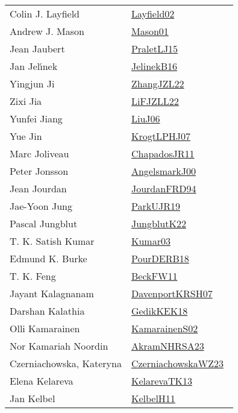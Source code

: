 {\begin{longtable}{p{4cm}p{20cm}}
Colin J. Layfield & \href{}{Layfield02}~\cite{Layfield02}\\
Andrew J. Mason & \href{articles/Mason01.pdf}{Mason01}~\cite{Mason01}\\
Jean Jaubert & \href{papers/PraletLJ15.pdf}{PraletLJ15}~\cite{PraletLJ15}\\
Jan Jel{\'{\i}}nek & \href{papers/JelinekB16.pdf}{JelinekB16}~\cite{JelinekB16}\\
Yingjun Ji & \href{papers/ZhangJZL22.pdf}{ZhangJZL22}~\cite{ZhangJZL22}\\
Zixi Jia & \href{papers/LiFJZLL22.pdf}{LiFJZLL22}~\cite{LiFJZLL22}\\
Yunfei Jiang & \href{papers/LiuJ06.pdf}{LiuJ06}~\cite{LiuJ06}\\
Yue Jin & \href{papers/KrogtLPHJ07.pdf}{KrogtLPHJ07}~\cite{KrogtLPHJ07}\\
Marc Joliveau & \href{papers/ChapadosJR11.pdf}{ChapadosJR11}~\cite{ChapadosJR11}\\
Peter Jonsson & \href{papers/AngelsmarkJ00.pdf}{AngelsmarkJ00}~\cite{AngelsmarkJ00}\\
Jean Jourdan & \href{}{JourdanFRD94}~\cite{JourdanFRD94}\\
Jae{-}Yoon Jung & \href{papers/ParkUJR19.pdf}{ParkUJR19}~\cite{ParkUJR19}\\
Pascal Jungblut & \href{}{JungblutK22}~\cite{JungblutK22}\\
T. K. Satish Kumar & \href{papers/Kumar03.pdf}{Kumar03}~\cite{Kumar03}\\
Edmund K. Burke & \href{articles/PourDERB18.pdf}{PourDERB18}~\cite{PourDERB18}\\
T. K. Feng & \href{}{BeckFW11}~\cite{BeckFW11}\\
Jayant Kalagnanam & \href{papers/DavenportKRSH07.pdf}{DavenportKRSH07}~\cite{DavenportKRSH07}\\
Darshan Kalathia & \href{articles/GedikKEK18.pdf}{GedikKEK18}~\cite{GedikKEK18}\\
Olli Kamarainen & \href{papers/KamarainenS02.pdf}{KamarainenS02}~\cite{KamarainenS02}\\
Nor Kamariah Noordin & \href{articles/AkramNHRSA23.pdf}{AkramNHRSA23}~\cite{AkramNHRSA23}\\
Czerniachowska, Kateryna & \href{articles/CzerniachowskaWZ23.pdf}{CzerniachowskaWZ23}~\cite{CzerniachowskaWZ23}\\
Elena Kelareva & \href{papers/KelarevaTK13.pdf}{KelarevaTK13}~\cite{KelarevaTK13}\\
Jan Kelbel & \href{articles/KelbelH11.pdf}{KelbelH11}~\cite{KelbelH11}\\

\end{longtable}}
